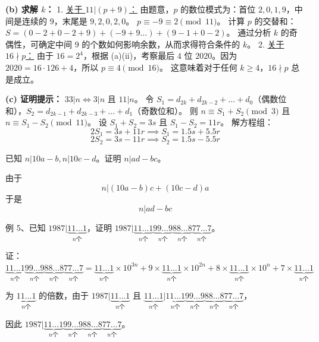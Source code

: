 \begin{questions}
\begin{solution}
\textbf{(b) 求解 $k$：}
1. \underline{关于 $11 | (p+9)$：}
由题意，$p$ 的数位模式为：首位 $2, 0, 1, 9$，中间是连续的 $9$，末尾是 $9, 2, 0, 2, 0$。
$p \equiv -9 \equiv 2 \pmod{11}$。
计算 $p$ 的交替和：$S = (0-2+0-2+9) + (-9+9 \dots) + (9-1+0-2)$。
通过分析 $k$ 的奇偶性，可确定中间 $9$ 的个数如何影响余数，从而求得符合条件的 $k$。
2. \underline{关于 $16 \nmid p$：}
由于 $16 = 2^4$，根据 (a)(ii)，考察最后 $4$ 位 $2020$。因为 $2020 = 16 \cdot 126 + 4$，所以 $p \equiv 4 \pmod{16}$。
这意味着对于任何 $k \ge 4$，$16 \nmid p$ 总是成立。

\textbf{(c) 证明提示：}
$33|n \iff 3|n$ 且 $11|n$。
令 $S_1 = d_{2k} + d_{2k-2} + \dots + d_0$（偶数位和），$S_2 = d_{2k-1} + d_{2k-3} + \dots + d_1$（奇数位和）。
则 $n \equiv S_1 + S_2 \pmod 3$ 且 $n \equiv S_1 - S_2 \pmod{11}$。
设 $S_1 + S_2 = 3s$ 且 $S_1 - S_2 = 11r$。
解方程组：
\[
2S_1 = 3s + 11r \implies S_1 = 1.5s + 5.5r
\]
\[
2S_2 = 3s - 11r \implies S_2 = 1.5s - 5.5r
\]
\end{solution}
    \question 已知 $n | 10a - b,n | 10c - d$。证明 $n | ad - bc$。
    \begin{solution}
        由于 
        \[
        n | (10a - b)c + (10c - d)a 
        \]
        于是
        \[ 
        n | ad - bc
        \]
    \end{solution}

    \question 例 5、已知 $1987 | \underbrace{11\dots1}_{n \text{个}}$，证明 $1987 | \underbrace{11\dots1}_{n \text{个}}\underbrace{99\dots9}_{n \text{个}}\underbrace{88\dots8}_{n \text{个}}\underbrace{77\dots7}_{n \text{个}}$。

    \begin{solution}
    证：$\underbrace{11\dots1}_{n \text{个}}\underbrace{99\dots9}_{n \text{个}}\underbrace{88\dots8}_{n \text{个}}\underbrace{77\dots7}_{n \text{个}} = \underbrace{11\dots1}_{n \text{个}} \times 10^{3n} + 9 \times \underbrace{11\dots1}_{n \text{个}} \times 10^{2n} + 8 \times \underbrace{11\dots1}_{n \text{个}} \times 10^n + 7 \times \underbrace{11\dots1}_{n \text{个}}$

    为 $\underbrace{11\dots1}_{n \text{个}}$ 的倍数，由于 $1987 | \underbrace{11\dots1}_{n \text{个}}$ 且 $\underbrace{11\dots1}_{n \text{个}} | \underbrace{11\dots1}_{n \text{个}}\underbrace{99\dots9}_{n \text{个}}\underbrace{88\dots8}_{n \text{个}}\underbrace{77\dots7}_{n \text{个}}$，

    因此 $1987 | \underbrace{11\dots1}_{n \text{个}}\underbrace{99\dots9}_{n \text{个}}\underbrace{88\dots8}_{n \text{个}}\underbrace{77\dots7}_{n \text{个}}$。
    \end{solution}


\end{questions}
